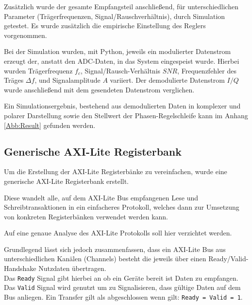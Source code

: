 Zusätzlich wurde der gesamte Empfangsteil anschließend, für unterschiedlichen Parameter (Trägerfrequenzen, Signal/Rauschverhältnis), durch Simulation getestet.
Es wurde zusätzlich die empirische Einstellung des Reglers vorgenommen.

Bei der Simulation wurden, mit Python, jeweils ein modulierter Datenstrom erzeugt der, anstatt den \acs{ADC}-Daten, in das System eingespeist wurde.
Hierbei wurden Trägerfrequenz $f_c$, Signal/Rausch-Verhältnis $SNR$, Frequenzfehler des Träges $\Delta f$, und Signalamplitude $A$ variiert.
Der demodulierte Datenstrom $I/Q$ wurde anschließend mit dem gesendeten Datenstrom verglichen.

Ein Simulationsergebnis, bestehend aus demodulierten Daten in komplexer und polarer Darstellung sowie den Stellwert der Phasen-Regelschleife kann im Anhang \ref{Abb:Result} gefunden werden.

\subsection{Generische \acs{AXI}-Lite Registerbank}
Um die Erstellung der \acs{AXI}-Lite Registerbänke zu vereinfachen, wurde eine generische \acs{AXI}-Lite Registerbank erstellt.

Diese wandelt alle, auf dem \acs{AXI}-Lite Bus empfangenen Lese und Schreibtransaktionen in ein einfacheres Protokoll, welches dann zur Umsetzung von 
konkreten Registerbänken verwendet werden kann.

Auf eine genaue Analyse des \acs{AXI}-Lite Protokolls soll hier verzichtet werden.

Grundlegend lässt sich jedoch zusammenfassen, dass ein \acs{AXI}-Lite Bus aus unterschiedlichen Kanälen (Channels) besteht die jeweils über einen Ready/Valid-Handshake Nutzdaten übertragen.\\
Das \lstinline|Ready| Signal gibt hierbei an ob ein Geräte bereit ist Daten zu empfangen. Das \lstinline|Valid| Signal wird genutzt um zu Signalisieren, dass gültige Daten auf dem Bus anliegen.
Ein Transfer gilt als abgeschlossen wenn gilt: \lstinline|Ready = Valid = 1|.\cite{ARM_AXI}

